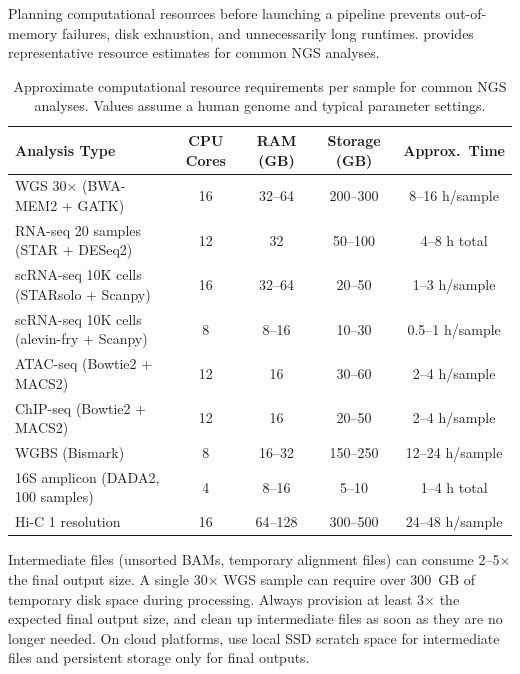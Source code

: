 Planning computational resources before launching a pipeline prevents out-of-memory failures, disk exhaustion, and unnecessarily long runtimes.  provides representative resource estimates for common NGS analyses.

\begin{table}[htbp]
\centering
\caption{Approximate computational resource requirements per sample for common NGS analyses. Values assume a human genome and typical parameter settings.}
\label{tab:resource-requirements}
\small
\renewcommand{\arraystretch}{1.3}
\begin{tabularx}{\textwidth}{@{}l c c c c@{}}
\toprule
\textbf{Analysis Type} & \textbf{CPU Cores} & \textbf{RAM (GB)} & \textbf{Storage (GB)} & \textbf{Approx.\ Time} \\
\midrule
WGS 30$\times$ (BWA-MEM2 + GATK) & 16 & 32--64 & 200--300 & 8--16 h/sample \\
\addlinespace
RNA-seq 20 samples (STAR + DESeq2) & 12 & 32 & 50--100 & 4--8 h total \\
\addlinespace
scRNA-seq 10K cells (STARsolo + Scanpy) & 16 & 32--64 & 20--50 & 1--3 h/sample \\
\addlinespace
scRNA-seq 10K cells (alevin-fry + Scanpy) & 8 & 8--16 & 10--30 & 0.5--1 h/sample \\
\addlinespace
ATAC-seq (Bowtie2 + MACS2) & 12 & 16 & 30--60 & 2--4 h/sample \\
\addlinespace
ChIP-seq (Bowtie2 + MACS2) & 12 & 16 & 20--50 & 2--4 h/sample \\
\addlinespace
WGBS (Bismark) & 8 & 16--32 & 150--250 & 12--24 h/sample \\
\addlinespace
16S amplicon (DADA2, 100 samples) & 4 & 8--16 & 5--10 & 1--4 h total \\
\addlinespace
Hi-C 1\kilobase{} resolution & 16 & 64--128 & 300--500 & 24--48 h/sample \\
\bottomrule
\end{tabularx}
\end{table}

\begin{warningbox}[title={Disk Space Is Often the Bottleneck}]
Intermediate files (unsorted BAMs, temporary alignment files) can consume 2--5$\times$ the final output size. A single 30$\times$ WGS sample can require over 300~GB of temporary disk space during processing. Always provision at least 3$\times$ the expected final output size, and clean up intermediate files as soon as they are no longer needed. On cloud platforms, use local SSD scratch space for intermediate files and persistent storage only for final outputs.
\end{warningbox}

